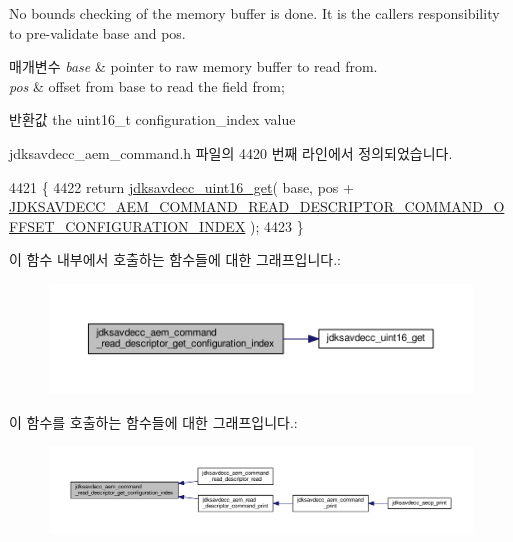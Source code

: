 No bounds checking of the memory buffer is done. It is the caller\textquotesingle{}s responsibility to pre-\/validate base and pos.


\begin{DoxyParams}{매개변수}
{\em base} & pointer to raw memory buffer to read from. \\
\hline
{\em pos} & offset from base to read the field from; \\
\hline
\end{DoxyParams}
\begin{DoxyReturn}{반환값}
the uint16\+\_\+t configuration\+\_\+index value 
\end{DoxyReturn}


jdksavdecc\+\_\+aem\+\_\+command.\+h 파일의 4420 번째 라인에서 정의되었습니다.


\begin{DoxyCode}
4421 \{
4422     \textcolor{keywordflow}{return} \hyperlink{group__endian_ga3fbbbc20be954aa61e039872965b0dc9}{jdksavdecc\_uint16\_get}( base, pos + 
      \hyperlink{group__command__read__descriptor_gac864906c26819b58db5421fe0b41a7d7}{JDKSAVDECC\_AEM\_COMMAND\_READ\_DESCRIPTOR\_COMMAND\_OFFSET\_CONFIGURATION\_INDEX}
       );
4423 \}
\end{DoxyCode}


이 함수 내부에서 호출하는 함수들에 대한 그래프입니다.\+:
\nopagebreak
\begin{figure}[H]
\begin{center}
\leavevmode
\includegraphics[width=350pt]{group__command__read__descriptor_ga0891905ce973732e8e344a90479dc123_cgraph}
\end{center}
\end{figure}




이 함수를 호출하는 함수들에 대한 그래프입니다.\+:
\nopagebreak
\begin{figure}[H]
\begin{center}
\leavevmode
\includegraphics[width=350pt]{group__command__read__descriptor_ga0891905ce973732e8e344a90479dc123_icgraph}
\end{center}
\end{figure}


